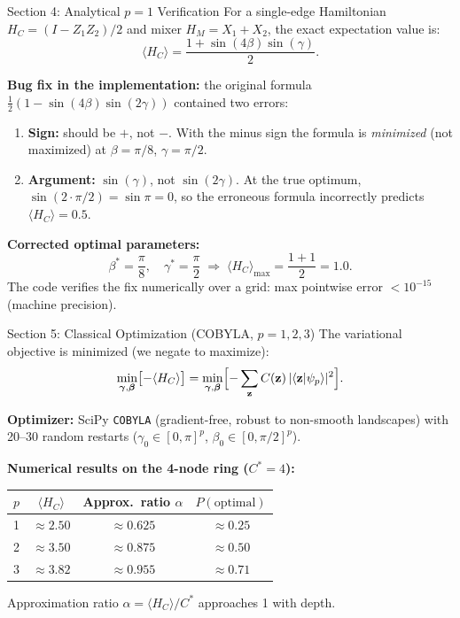 \documentclass{beamer}
\begin{document}

\begin{frame}{Section 4: Analytical $p=1$ Verification}
For a single-edge Hamiltonian $H_C = (I - Z_1 Z_2)/2$ and
mixer $H_M = X_1 + X_2$, the exact expectation value is:
\[
  \langle H_C\rangle = \frac{1 + \sin(4\beta)\sin(\gamma)}{2}.
\]

\textbf{Bug fix in the implementation:} the original formula
$\frac{1}{2}(1 - \sin(4\beta)\sin(2\gamma))$ contained two errors:
\begin{enumerate}
  \item \textbf{Sign:} should be $+$, not $-$.
        With the minus sign the formula is \emph{minimized} (not maximized)
        at $\beta = \pi/8$, $\gamma = \pi/2$.
  \item \textbf{Argument:} $\sin(\gamma)$, not $\sin(2\gamma)$.
        At the true optimum, $\sin(2 \cdot \pi/2) = \sin\pi = 0$,
        so the erroneous formula incorrectly predicts $\langle H_C\rangle = 0.5$.
\end{enumerate}

\textbf{Corrected optimal parameters:}
\[
  \beta^* = \frac{\pi}{8}, \quad \gamma^* = \frac{\pi}{2}
  \;\Rightarrow\;
  \langle H_C\rangle_{\max} = \frac{1+1}{2} = 1.0.
\]
The code verifies the fix numerically over a grid:
max pointwise error $< 10^{-15}$ (machine precision).
\end{frame}


\begin{frame}{Section 5: Classical Optimization (COBYLA, $p=1,2,3$)}
The variational objective is minimized (we negate to maximize):
\[
  \min_{\boldsymbol{\gamma},\boldsymbol{\beta}} \bigl[-\langle H_C\rangle\bigr]
  = \min_{\boldsymbol{\gamma},\boldsymbol{\beta}}
    \Bigl[-\sum_{\mathbf{z}} C(\mathbf{z})\,|\langle\mathbf{z}|\psi_p\rangle|^2\Bigr].
\]

\textbf{Optimizer:} SciPy \texttt{COBYLA} (gradient-free, robust to
non-smooth landscapes) with 20--30 random restarts
($\gamma_0 \in [0,\pi]^p$, $\beta_0 \in [0,\pi/2]^p$).

\medskip

\textbf{Numerical results on the 4-node ring ($C^* = 4$):}
\begin{center}
\small
\begin{tabular}{cccc}
\hline
$p$ & $\langle H_C\rangle$ & Approx.\ ratio $\alpha$ & $P(\text{optimal})$ \\
\hline
1 & $\approx 2.50$ & $\approx 0.625$ & $\approx 0.25$ \\
2 & $\approx 3.50$ & $\approx 0.875$ & $\approx 0.50$ \\
3 & $\approx 3.82$ & $\approx 0.955$ & $\approx 0.71$ \\
\hline
\end{tabular}
\end{center}

\medskip
Approximation ratio $\alpha = \langle H_C\rangle / C^*$ approaches 1 with depth.
\end{frame}
\end{document}
